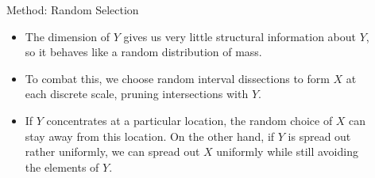 \documentclass[final]{beamer}
\newlength{\sepwid}
\newlength{\onecolwid}
\newlength{\twocolwid}
\begin{document}
\begin{frame}[t]
\begin{columns}[t]
\begin{column}{\twocolwid}
\begin{columns}[t,totalwidth=\twocolwid]
\end{columns} %

\end{column} %

\begin{column}{\sepwid}\end{column} %

\begin{column}{\onecolwid} %


\vspace{4cm}

\begin{block}{Method: Random Selection}

\begin{itemize}
	\item The dimension of $Y$ gives us very little structural information about $Y$, so it behaves like a random distribution of mass.

	\item To combat this, we choose random interval dissections to form $X$ at each discrete scale, pruning intersections with $Y$.

	\item If $Y$ concentrates at a particular location, the random choice of $X$ can stay away from this location. On the other hand, if $Y$ is spread out rather uniformly, we can spread out $X$ uniformly while still avoiding the elements of $Y$.
\end{itemize}
\end{block}

\begin{figure}
\end{figure}
\end{column}
\end{columns}
\end{frame}
\end{document}
